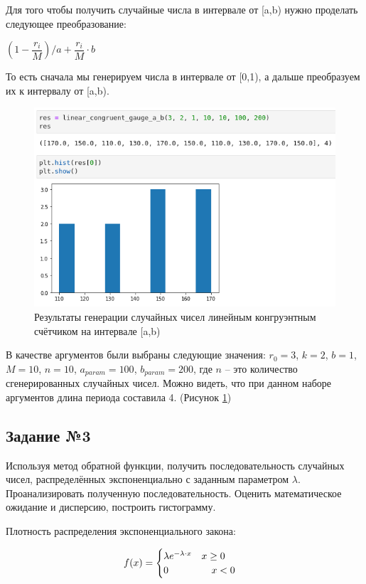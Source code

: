 \documentclass[14pt,fleqn]{extarticle}
\begin{document}
	Для того чтобы получить случайные числа в интервале от [a,b) нужно проделать следующее преобразование:
	\begin{center}
		$(1 - \dfrac{r_i}{M})/a + \dfrac{r_i}{M} \cdot b$
	\end{center}
	То есть сначала мы генерируем числа в интервале от [0,1), а дальше преобразуем их к интервалу от [a,b).
 	\begin{figure}[h]
		\centering \includegraphics[scale=0.52]{result22}
		\caption{Результаты генерации случайных чисел линейным конгруэнтным счётчиком на интервале [a,b)}
		\label{fig:linear_congruent_gauge_a_b_result}
	\end{figure}
    \newpage
	В качестве аргументов были выбраны следующие значения: $r_0 = 3$, $k = 2$, $b = 1$, $M = 10$, $n = 10$, $a_{param} = 100$, $b_{param} = 200$, где $n$ -- это количество сгенерированных случайных чисел. Можно видеть, что при данном наборе аргументов длина периода составила 4. (Рисунок \ref{fig:linear_congruent_gauge_a_b_result})\\
	
	\subsection*{Задание №3}
	Используя метод обратной функции, получить последовательность случайных чисел, распределённых экспоненциально с заданным параметром $\lambda$. Проанализировать полученную последовательность. Оценить математическое ожидание  и дисперсию, построить гистограмму.\\
	\newline
	
	Плотность распределения экспоненциального закона:
	\begin{ceqn}
	\begin{align*}
		f(x) =
		\begin{cases}
			\lambda e^{-\lambda \cdot x} \quad x \geq 0\\
			0 \hspace{1.55cm} x < 0
		\end{cases}
	\end{align*}
	\end{ceqn}
\end{document}
